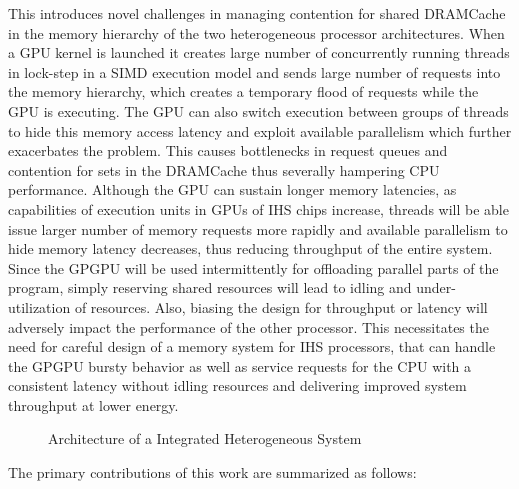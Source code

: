 \par This introduces novel challenges in managing contention for shared DRAMCache in the memory hierarchy of the two heterogeneous processor architectures. When a GPU kernel is launched it creates large number of concurrently running threads in lock-step in a SIMD execution model and sends large number of requests into the memory hierarchy, which creates a temporary flood of requests while the GPU is executing. The GPU can also switch execution between groups of threads to hide this memory access latency and exploit available parallelism which further exacerbates the problem. This causes bottlenecks in request queues and contention for sets in the DRAMCache thus severally hampering CPU performance. Although the GPU can sustain longer memory latencies, as capabilities of execution units in GPUs of IHS chips increase, threads will be able issue larger number of memory requests more rapidly and available parallelism to hide memory latency decreases, thus reducing throughput of the entire system. Since the GPGPU will be used intermittently for offloading parallel parts of the program, simply reserving shared resources will lead to idling and under-utilization of resources. Also, biasing the design for throughput or latency will adversely impact the performance of the other processor. This necessitates the need for careful design of a memory system for IHS processors, that can handle the GPGPU bursty behavior as well as service requests for the CPU with a consistent latency without idling resources and delivering improved system throughput at lower energy.


\begin{figure*}[!htb]
    \centering
    \hsacpu
    \caption{Architecture of a Integrated Heterogeneous System}
    \label{hsa-arch}
\end{figure*}
The primary contributions of this work are summarized as follows:

